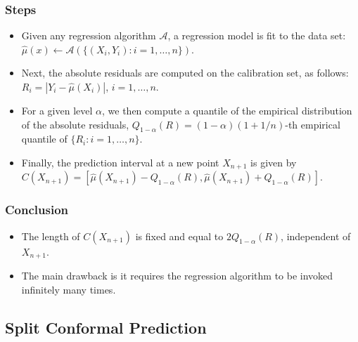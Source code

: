 \documentclass[11pt,a4paper]{article}
\begin{document}
\subsubsection{Steps}
\begin{itemize}
    \item Given any regression algorithm $\mathcal{A}$, a regression model is fit to the data set: $\hat{\mu}(x) \leftarrow \mathcal{A}(\{(X_i, Y_i) : i = 1, \dots, n\})$.
    \item Next, the absolute residuals are computed on the calibration set, as follows: $R_i = |Y_i - \hat{\mu}(X_i)|$, $i = 1, \dots, n$.
    \item For a given level $\alpha$, we then compute a quantile of the empirical distribution of the absolute residuals, $Q_{1-\alpha}(R) = (1 - \alpha)(1 + 1/n)$-th empirical quantile of $\{R_i : i = 1, \dots, n\}$.
    \item Finally, the prediction interval at a new point $X_{n+1}$ is given by $C(X_{n+1}) = [\hat{\mu}(X_{n+1}) - Q_{1-\alpha}(R), \hat{\mu}(X_{n+1}) + Q_{1-\alpha}(R)]$.
\end{itemize}

\subsubsection{Conclusion}
\begin{itemize}
    \item The length of $C(X_{n+1})$ is fixed and equal to $2Q_{1-\alpha}(R)$, independent of $X_{n+1}$.
    \item The main drawback is it requires the regression algorithm to be invoked infinitely many times.
\end{itemize}

\subsection{Split Conformal Prediction}
\end{document}
